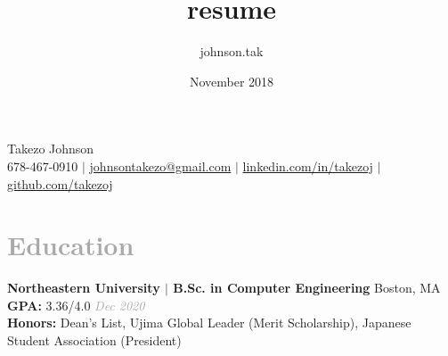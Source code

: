 \documentclass{article}
\title{resume}
\author{johnson.tak }
\date{November 2018}
\newcommand\HUGE{\fontsize{20}{50}\selectfont}
\begin{document}
\thispagestyle{empty}

{\selectfont	%

\titleformat{\section}{\Large}{}{0em}{}{}
\titleformat{\subsection}{}{}{0em}{}{}

\renewcommand{\maketitle}{
\begin{center}
{\HUGE Takezo Johnson}\\
\vspace{1em}
\faMobilePhone{ }678-467-0910 $\mid$ 
\href{mailto:johnsontakezo@gmail.com}{\faSend{ }johnsontakezo@gmail.com} $\mid$ 
\href{https://www.linkedin.com/in/takezoj}{\faLinkedinSquare{ }linkedin.com/in/takezoj} $\mid$ 
\href{https://www.github.com/takezoj}{\faGithub{ }github.com/takezoj}
\end{center}}

\newenvironment{myitemize}
{ \begin{itemize}
    \setlength{\itemsep}{0pt}
    \setlength{\parskip}{0pt}
    \setlength{\parsep}{0pt}}
{ \end{itemize}} 

\maketitle

\section[Education \hfill]{\textcolor{darkgray}{Education \sout{\hfill}}}
    {\bfseries\large Northeastern University $\mid$ B.Sc. in Computer Engineering} \hfill Boston, MA\\
    {\bfseries GPA:} 3.36/4.0 \hfill\textit{\textcolor{darkgray}{Dec 2020}}\\
    {\bfseries Honors:} Dean's List, Ujima Global Leader (Merit Scholarship), Japanese Student Association (President)

}
\end{document}
